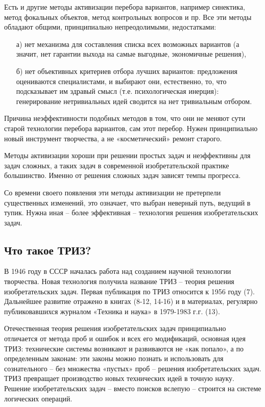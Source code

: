 \documentclass[11pt,a4paper]{article}
\begin{document}
Есть и другие методы активизации перебора вариантов, например синектика, метод
фокальных объектов, метод контрольных вопросов и пр. Все эти методы обладают
общими, принципиально непреодолимыми, недостатками:
\begin{itemize}
\item[а)] нет механизма для составления списка всех возможных вариантов (а
  значит, нет гарантии выхода на самые выгодные, экономичные решения),
\item[б)] нет объективных критериев отбора лучших вариантов: предложения
  оцениваются специалистами, и выбирают они, естественно, то, что подсказывает
  им здравый смысл (т.е. психологическая инерция): генерирование нетривиальных
  идей сводится на нет тривиальным отбором.
\end{itemize}

Причина неэффективности подобных методов в том, что они не меняют сути старой
технологии перебора вариантов, сам этот перебор. Нужен принципиально новый
инструмент творчества, а не «косметический» ремонт старого.

Методы активизации хороши при решении простых задач и неэффективны для задач
сложных, а таких задач в современной изобретательской практике большинство.
Именно от решения сложных задач зависят темпы прогресса.

Со времени своего появления эти методы активизации не претерпели существенных
изменений, это означает, что выбран неверный путь, ведущий в тупик. Нужна иная
-- более эффективная -- технология решения изобретательских задач.

\subsection{Что такое ТРИЗ?}

В 1946 году в СССР началась работа над созданием научной технологии
творчества.  Новая технология получила название ТРИЗ -- теория решения
изобретательских задач. Первая публикация по ТРИЗ относится к 1956 году
(7). Дальнейшее развитие отражено в книгах (8-12, 14-16) и в материалах,
регулярно публиковавшихся журналом «Техника и наука» в 1979-1983 г.г. (13).

Отечественная теория решения изобретательских задач принципиально отличается
от метода проб и ошибок и всех его модификаций, основная идея ТРИЗ:
технические системы возникают и развиваются не «как попало», а по определенным
законам: эти законы можно познать и использовать для сознательного -- без
множества «пустых» проб -- решения изобретательских задач. ТРИЗ превращает
производство новых технических идей в точную науку. Решение изобретательских
задач -- вместо поисков вслепую -- строится на системе логических операций.
\end{document}
